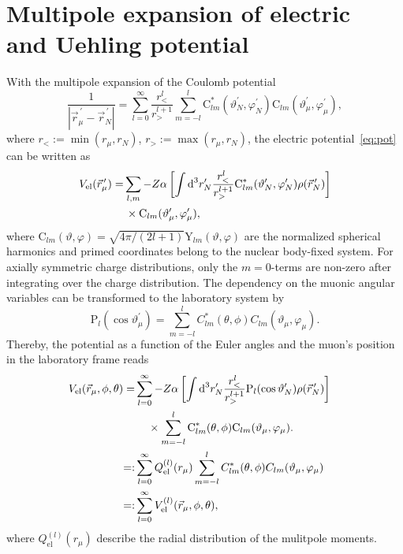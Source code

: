 \section{Multipole expansion of electric \\and Uehling potential}
\label{sec:multipole}
With the multipole expansion of the Coulomb potential~\cite{jackson1999}
\begin{equation}
\frac{1}{|\vec{r}_\mu^{\,\prime}-\vec{r}_N^{\,\prime}|}=\sum_{l=0}^\infty \frac{r_<^l}{r_>^{l+1}}\sum_{m=-l}^l  \text{C}^*_{lm}(\vartheta_N^{\prime},\varphi_N^{\prime})\text{C}_{lm}(\vartheta_\mu^\prime,\varphi_\mu^\prime),
\end{equation}
where $r_<:=\min (r_\mu,r_N)$, $r_>:=\max (r_\mu,r_N)$, the electric potential~\eqref{eq:pot} can be written as
\begin{align}
V_{\text{el}}(\vec{r}_\mu^{\,\prime})=&\sum_{l,m}-Z\alpha \left[ \int \text{d}^3r^{\prime}_N \frac{r_<^l}{r_>^{l+1}}\text{C}^*_{lm}(\vartheta_N^{\prime},\varphi_N^{\prime})\rho(\vec{r}_N^{\,\prime})\right]\notag\\
&\,\times\text{C}_{lm}(\vartheta_\mu^{\prime},\varphi_\mu^\prime),
\end{align}
where ${\text{C}_{lm}(\vartheta,\varphi)}{=}{\sqrt{4\pi/(2l+1)}\text{Y}_{lm}(\vartheta,\varphi)}$ are the normalized spherical harmonics and primed coordinates belong to the nuclear body-fixed system.
For axially symmetric charge distributions, only the ${m}{=}{0}$-terms are non-zero after integrating over the charge distribution. The dependency on the muonic angular variables can be transformed to the laboratory system by
\begin{equation}
\text{P}_{l}(\cos\vartheta_\mu^\prime)=
 \sum_{m=-l}^l C^*_{lm}(\theta,\phi)C_{lm}(\vartheta_\mu,\varphi_\mu).
\end{equation}
Thereby, the potential as a function of the Euler angles and the muon's position in the laboratory frame reads
\begin{align}
V_{\text{el}}(\vec{r}_\mu,\phi,\theta)=&\sum_{l=0}^\infty-Z\alpha \left[ \int \text{d}^3r^{\prime}_N \frac{r_<^l}{r_>^{l+1}}\text{P}_{l}(\cos \vartheta_N^{\prime})\rho(\vec{r}_N^{\,\prime})\right]\notag\\
&\quad\,\times \sum_{m=-l}^l \text{C}^*_{lm}(\theta,\phi)\text{C}_{lm}(\vartheta_\mu,\varphi_\mu).\notag\\
=:&\sum_{l=0}^\infty Q_{\text{el}}^{(l)}(r_\mu)\sum_{m=-l}^lC^*_{lm}(\theta,\phi)C_{lm}(\vartheta_\mu,\varphi_\mu)&\notag\\
=:& \sum_{l=0}^\infty V^{(l)}_{\text{el}}(\vec{r}_\mu,\phi,\theta),
\label{eq:defmulti}
\end{align}
where $Q_{\text{el}}^{(l)}(r_\mu)$ describe the radial distribution of the mulitpole moments.

